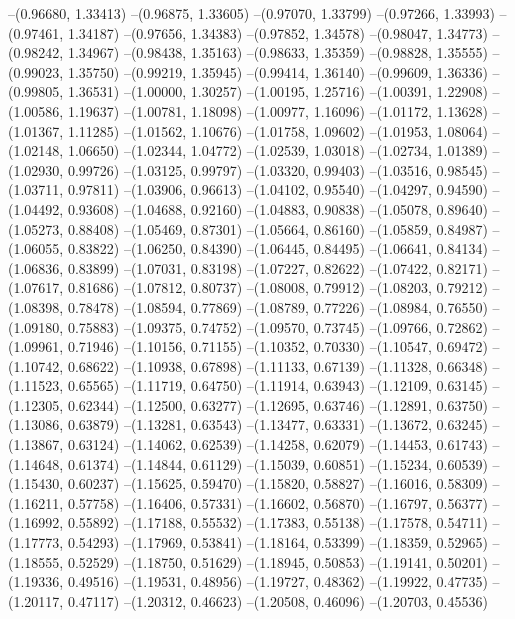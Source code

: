 --(0.96680, 1.33413)
--(0.96875, 1.33605)
--(0.97070, 1.33799)
--(0.97266, 1.33993)
--(0.97461, 1.34187)
--(0.97656, 1.34383)
--(0.97852, 1.34578)
--(0.98047, 1.34773)
--(0.98242, 1.34967)
--(0.98438, 1.35163)
--(0.98633, 1.35359)
--(0.98828, 1.35555)
--(0.99023, 1.35750)
--(0.99219, 1.35945)
--(0.99414, 1.36140)
--(0.99609, 1.36336)
--(0.99805, 1.36531)
--(1.00000, 1.30257)
--(1.00195, 1.25716)
--(1.00391, 1.22908)
--(1.00586, 1.19637)
--(1.00781, 1.18098)
--(1.00977, 1.16096)
--(1.01172, 1.13628)
--(1.01367, 1.11285)
--(1.01562, 1.10676)
--(1.01758, 1.09602)
--(1.01953, 1.08064)
--(1.02148, 1.06650)
--(1.02344, 1.04772)
--(1.02539, 1.03018)
--(1.02734, 1.01389)
--(1.02930, 0.99726)
--(1.03125, 0.99797)
--(1.03320, 0.99403)
--(1.03516, 0.98545)
--(1.03711, 0.97811)
--(1.03906, 0.96613)
--(1.04102, 0.95540)
--(1.04297, 0.94590)
--(1.04492, 0.93608)
--(1.04688, 0.92160)
--(1.04883, 0.90838)
--(1.05078, 0.89640)
--(1.05273, 0.88408)
--(1.05469, 0.87301)
--(1.05664, 0.86160)
--(1.05859, 0.84987)
--(1.06055, 0.83822)
--(1.06250, 0.84390)
--(1.06445, 0.84495)
--(1.06641, 0.84134)
--(1.06836, 0.83899)
--(1.07031, 0.83198)
--(1.07227, 0.82622)
--(1.07422, 0.82171)
--(1.07617, 0.81686)
--(1.07812, 0.80737)
--(1.08008, 0.79912)
--(1.08203, 0.79212)
--(1.08398, 0.78478)
--(1.08594, 0.77869)
--(1.08789, 0.77226)
--(1.08984, 0.76550)
--(1.09180, 0.75883)
--(1.09375, 0.74752)
--(1.09570, 0.73745)
--(1.09766, 0.72862)
--(1.09961, 0.71946)
--(1.10156, 0.71155)
--(1.10352, 0.70330)
--(1.10547, 0.69472)
--(1.10742, 0.68622)
--(1.10938, 0.67898)
--(1.11133, 0.67139)
--(1.11328, 0.66348)
--(1.11523, 0.65565)
--(1.11719, 0.64750)
--(1.11914, 0.63943)
--(1.12109, 0.63145)
--(1.12305, 0.62344)
--(1.12500, 0.63277)
--(1.12695, 0.63746)
--(1.12891, 0.63750)
--(1.13086, 0.63879)
--(1.13281, 0.63543)
--(1.13477, 0.63331)
--(1.13672, 0.63245)
--(1.13867, 0.63124)
--(1.14062, 0.62539)
--(1.14258, 0.62079)
--(1.14453, 0.61743)
--(1.14648, 0.61374)
--(1.14844, 0.61129)
--(1.15039, 0.60851)
--(1.15234, 0.60539)
--(1.15430, 0.60237)
--(1.15625, 0.59470)
--(1.15820, 0.58827)
--(1.16016, 0.58309)
--(1.16211, 0.57758)
--(1.16406, 0.57331)
--(1.16602, 0.56870)
--(1.16797, 0.56377)
--(1.16992, 0.55892)
--(1.17188, 0.55532)
--(1.17383, 0.55138)
--(1.17578, 0.54711)
--(1.17773, 0.54293)
--(1.17969, 0.53841)
--(1.18164, 0.53399)
--(1.18359, 0.52965)
--(1.18555, 0.52529)
--(1.18750, 0.51629)
--(1.18945, 0.50853)
--(1.19141, 0.50201)
--(1.19336, 0.49516)
--(1.19531, 0.48956)
--(1.19727, 0.48362)
--(1.19922, 0.47735)
--(1.20117, 0.47117)
--(1.20312, 0.46623)
--(1.20508, 0.46096)
--(1.20703, 0.45536)
